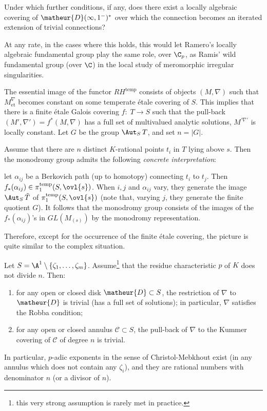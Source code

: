 \begin{que}\label{que::3.5.5} Under which further conditions, if any,
 does there exist a locally algebraic covering of
 $\matheur{D}(\infty,1^-)^\ast$ 
 over which the connection becomes an iterated extension of trivial
 connections?
\end{que}
At any rate, in the cases where this holds, this would let Ramero's
locally algebraic fundamental group play the same role, 
over $\C_p$, as Ramis' wild fundamental group (over $\C$) in the local
study of meromorphic irregular singularities.

\begin{para}\label{para::3.5.6} The essential image of the functor
 $RH^{\mathrm{temp}}$ consists of objects $(M,\nabla)$ such that 
 $M_{\mathrm{et}}^\nabla$ becomes constant on some temperate \'etale
 covering of $S$.  This implies that there is a finite \'etale Galois
covering $f:\;T\to S$ such that the pull-back
$(M',\nabla')=f^\ast(M,\nabla)$ has a full set of multivalued analytic
solutions, \ie $M^{\prime \nabla'}$ is locally constant. Let $G$ be the group
$\Aut_S\,T$, and set $n=| G| $.
 
Assume that there are $n$ distinct $K$-rational points $t_i$ in $T$
 lying above $s$. Then the monodromy group admits the following {\it
 concrete interpretation}: 

\noindent let $\alpha_{ij}$ be a Berkovich path (up to homotopy)
connecting $t_i$ to $t_j$. Then $f_\ast(\alpha_{ij})\in
\pi_1^{\mathrm{temp}}(S,\ovl{s})$. When $i,j$ and $\alpha_{ij}$ vary,
they generate the image $\Aut_S\,\tilde T$ of
$\pi_1^{\mathrm{temp}}(S,\ovl{s})$ (note that, varying $j$, they
generate the finite quotient $G$). It follows that the monodromy group
consists of the images of the $f_\ast(\alpha_{ij})$'s in $GL(M_{(s)})$
by the monodromy representation.

Therefore, except for the occurrence of the finite \'etale covering, the 
picture is quite similar to the complex situation.
 

\end{para}

\begin{pro}\label{pro::3.5.7} Let $S=\A^1\setminus\{\zeta_1,\ldots,
 \zeta_m\}$. Assume\footnote{this very strong assumption is rarely met
 in practice.} that the residue characteristic $p$ of $K$ does not
 divide $n$. Then:
 \begin{enumerate}
  \renewcommand{\theenumi}{\alph{enumi}}
  \item for any open or closed disk $\matheur{D}\subset S$, the restriction of
	$\nabla$ to $\matheur{D}$ is trivial (\ie has a full set of solutions); in
	particular, $\nabla$ satisfies the Robba condition;
  \item for any open or closed annulus
	$\mathcal{C}\subset S$, the pull-back of $\nabla$ to the Kummer
	covering of $\mathcal{C}$ of degree $n$ is trivial.
 \end{enumerate}

 In particular,
 $p$-adic exponents in the sense of Christol-Mebkhout exist (in any
 annulus which does not contain any $\zeta_i$), and they are rational
 numbers with denominator $n$ (or a divisor of $n$).
\end{pro}


